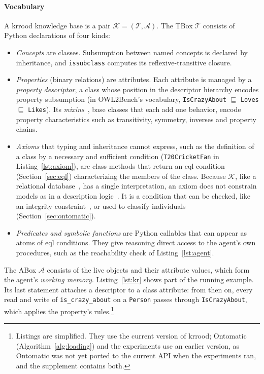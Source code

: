 \documentclass[sigconf,anonymous]{aamas}
\begin{document}
\paragraph{Vocabulary}
A \ac{krrood} knowledge base is a pair $\mathcal{K}=(\mathcal{T},\mathcal{A})$. The TBox $\mathcal{T}$ consists of Python declarations of four kinds:
\begin{itemize}
  \item \emph{Concepts} are classes. Subsumption between named concepts is declared by inheritance, and \texttt{issubclass} computes its reflexive-transitive closure.
  \item \emph{Properties} (binary relations) are attributes. Each attribute is managed by a \emph{property descriptor}, a class whose position in the descriptor hierarchy encodes property subsumption (in OWL2Bench's vocabulary, \texttt{IsCrazyAbout} $\sqsubseteq$ \texttt{Loves} $\sqsubseteq$ \texttt{Likes}). Its \emph{mixins}~\cite{bracha1990mixin}, base classes that each add one behavior, encode property characteristics such as transitivity, symmetry, inverses and property chains.
  \item \emph{Axioms} that typing and inheritance cannot express, such as the definition of a class by a necessary and sufficient condition (\texttt{T20CricketFan} in Listing~\ref{lst:axiom}), are class methods that return an \ac{eql} condition (Section~\ref{sec:eql}) characterizing the members of the class. Because $\mathcal{K}$, like a relational database~\cite{reiter1984relational}, has a single interpretation, an axiom does not constrain models as in a description logic~\cite{baader2003dlhandbook}. It is a condition that can be checked, like an integrity constraint~\cite{motik2009bridging,tao2010integrity}, or used to classify individuals (Section~\ref{sec:ontomatic}).
  \item \emph{Predicates and symbolic functions} are Python callables that can appear as atoms of \ac{eql} conditions. They give reasoning direct access to the agent's own procedures, such as the reachability check of Listing~\ref{lst:agent}.
\end{itemize}
The ABox $\mathcal{A}$ consists of the live objects and their attribute values, which form the agent's \emph{working memory}. Listing~\ref{lst:kr} shows part of the running example. Its last statement attaches a descriptor to a class attribute: from then on, every read and write of \texttt{is\_crazy\_about} on a \texttt{Person} passes through \texttt{IsCrazyAbout}, which applies the property's rules.\footnote{Listings are simplified. They use the current version of \acs{krrood}; Ontomatic (Algorithm~\ref{alg:loading}) and the experiments use an earlier version, as Ontomatic was not yet ported to the current API when the experiments ran, and the supplement contains both.}
\end{document}

